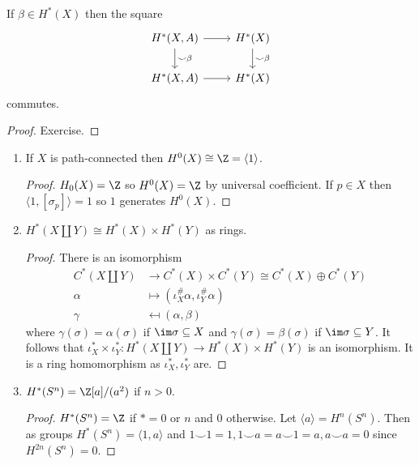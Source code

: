 \documentclass[a4paper]{article}
\newcommand*{\cp}{\smile} %
\begin{document}
\begin{lemma}
  If \(\beta \in H^*(X)\) then the square
  \[
    \begin{tikzcd}
      H^*(X, A) \ar[r] \ar[d, "\cp \beta"] & H^*(X) \ar[d, "\cp \beta"] \\
      H^*(X, A) \ar[r] & H^*(X)
    \end{tikzcd}
  \]
  commutes.
\end{lemma}

\begin{proof}
  Exercise.
\end{proof}

\begin{eg}\leavevmode
  \begin{enumerate}
  \item If \(X\) is path-connected then \(H^0(X) \cong \Z = \langle 1\rangle\).
    \begin{proof}
      \(H_0(X) = \Z\) so \(H^0(X) = \Z\) by universal coefficient. If \(p \in X\) then \(\langle 1, [\sigma_p] \rangle = 1\) so \(1\) generates \(H^0(X)\).
    \end{proof}
  \item \(H^*(X \amalg Y) \cong H^*(X) \times H^*(Y)\) as rings.
    \begin{proof}
      There is an isomorphism
      \begin{align*}
        C^*(X \amalg Y) &\to C^*(X) \times C^*(Y) \cong C^*(X) \oplus C^*(Y) \\
        \alpha &\mapsto (\iota_X^\# \alpha, \iota_Y^\# \alpha) \\
        \gamma &\mapsfrom (\alpha, \beta)
      \end{align*}
      where \(\gamma(\sigma) = \alpha(\sigma)\) if \(\im \sigma \subseteq X\) and \(\gamma(\sigma) = \beta(\sigma)\) if \(\im \sigma \subseteq Y\). It follows that \(\iota_X^* \times \iota_Y^*: H^*(X \amalg Y) \to H^*(X) \times H^*(Y)\) is an isomorphism. It is a ring homomorphism as \(\iota_X^*, \iota_Y^*\) are.
    \end{proof}
  \item \(H^*(S^n) = \Z[a]/(a^2)\) if \(n > 0\).
    \begin{proof}
      \(H^*(S^n) = \Z\) if \(* = 0\) or \(n\) and \(0\) otherwise. Let \(\langle a \rangle = H^n(S^n)\). Then as groups \(H^*(S^n) = \langle1, a \rangle\) and \(1 \cp 1 = 1, 1 \cp a = a \cp 1 = a, a \cp a = 0\) since \(H^{2n}(S^n) = 0\).
    \end{proof}
  \end{enumerate}
\end{eg}
\end{document}
